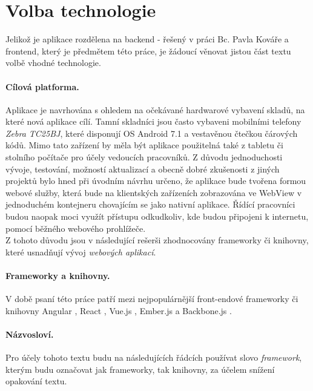 \section{Volba technologie}\label{technology}

Jelikož je aplikace rozdělena na backend - řešený v práci Bc. Pavla Kováře \cite{master-kovar} a frontend, který je předmětem této práce, je žádoucí věnovat jistou část textu volbě vhodné technologie.

\paragraph{Cílová platforma.} Aplikace je navrhována s ohledem na očekávané hardwarové vybavení skladů, na které nová aplikace cílí. Tamní skladníci jsou často vybaveni mobilními telefony \emph{Zebra TC25BJ}, které disponují OS Android 7.1 a vestavěnou čtečkou čárových kódů. Mimo tato zařízení by měla být aplikace použitelná také z tabletu či stolního počítače pro účely vedoucích pracovníků. Z důvodu jednoduchosti vývoje, testování, možností aktualizací a obecně dobré zkušenosti z jiných projektů bylo hned při úvodním návrhu určeno, že aplikace bude tvořena formou webové služby, která bude na klientských zařízeních zobrazována ve WebView v jednoduchém kontejneru chovajícím se jako nativní aplikace. Řídící pracovníci budou naopak moci využít přístupu odkudkoliv, kde budou připojeni k internetu, pomocí běžného webového prohlížeče.\\
Z tohoto důvodu jsou v následující rešerši zhodnocovány frameworky či knihovny, které usnadňují vývoj \emph{webových aplikací}.

\paragraph{Frameworky a knihovny.} V době psaní této práce patří mezi nejpopulárnější \cite{frameworks-github} \cite{frameworks-hackr} front-endové frameworky či knihovny Angular \cite{angular}, React \cite{react}, Vue.js \cite{vue}, Ember.js \cite{ember} a Backbone.js \cite{backbone}.

\paragraph{Názvosloví.} Pro účely tohoto textu budu na následujících řádcích používat slovo \emph{framework}, kterým budu označovat jak frameworky, tak knihovny, za účelem snížení opakování textu.\\

